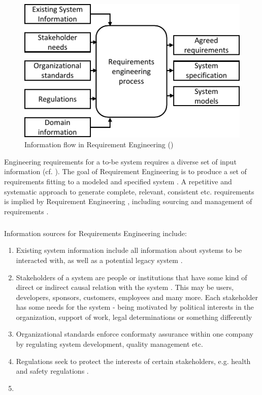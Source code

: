 \begin{figure}[H]
    \centering
    \includegraphics[scale=1.3]{img/RequirementInformationStream.pdf}
    \caption[Information flow in Requirements Engineering]{Information flow in Requirement Engineering (\protect\cite[28]{Kotonya.2000})}
    \label{fig:reqFlow}
\end{figure}
Engineering requirements for a to-be system requires a diverse set of input information (cf. ). The goal of Requirement Engineering is to produce a set of requirements fitting to a modeled and specified system \parencite[cf.][28]{Kotonya.2000}. A repetitive and systematic approach to generate complete, relevant, consistent etc. requirements is implied by Requirement Engineering \parencite[5]{Sommerville.2000}, including sourcing and management of requirements \parencite[262]{Pohl.2007}.
\subparagraph*{}
Information sources for Requirements Engineering include:
\begin{enumerate}
    \item Existing system information include all information about systems to be interacted with, as well as a potential legacy system \parencite[cf.][28]{Kotonya.2000}.
    \item Stakeholders of a system are people or institutions that have some kind of direct or indirect causal relation with the system \parencite[cf.][8]{Sommerville.2000}. This may be users, developers, sponsors, customers, employees and many more. Each stakeholder has some needs for the system - being motivated by political interests in the organization, support of work, legal determinations or something differently \parencites[cf.][28]{Kotonya.2000}[cf.][350-351]{Lauesen.2008}
    \item Organizational standards enforce conformaty assurance within one company by regulating system development, quality management etc. \parencite[28]{Kotonya.2000}
    \item Regulations seek to protect the interests of certain stakeholders, e.g. health and safety regulations \parencite[cf.][28]{Kotonya.2000}.
    \item {} \parencite[28]{Kotonya.2000} 
\end{enumerate}

